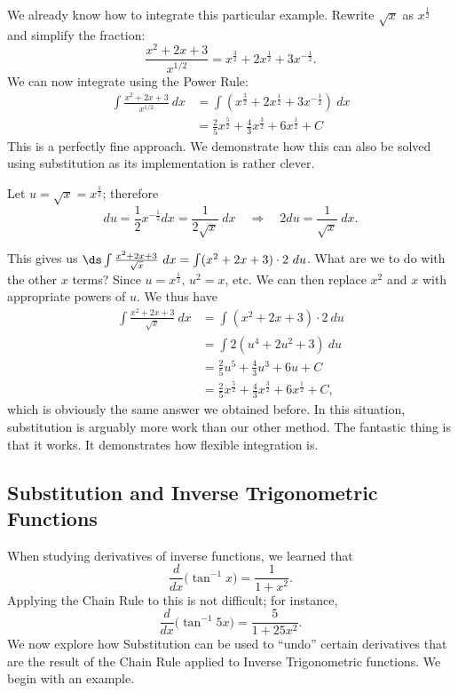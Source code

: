 \begin{solution}
{We already know how to integrate this particular example. Rewrite $\sqrt{x}$ as $x^\frac12$ and simplify the fraction:
	$$ \frac{x^2+2x+3}{x^{1/2}} = x^\frac32 + 2x^\frac12 + 3x^{-\frac12}.$$
We can now integrate using the Power Rule:
\begin{align*}
	\int \frac{x^2+2x+3}{x^{1/2}}\ dx &= \int\left(x^\frac32 + 2x^\frac12 + 3x^{-\frac12}\right)\ dx\\
						&=	\frac25x^\frac52 + \frac43x^\frac32 + 6x^\frac12 + C
\end{align*}
This is a perfectly fine approach. We demonstrate how this can also be solved using substitution as its implementation is rather clever.

Let $u = \sqrt{x} = x^\frac12$; therefore 
		$$du = \frac12x^{-\frac12}dx = \frac{1}{2\sqrt{x}}\ dx \quad \Rightarrow \quad 2du = \frac{1}{\sqrt{x}}\ dx.$$
		
This gives us $\ds \int \frac{x^2+2x+3}{\sqrt{x}}\ dx = \int (x^2+2x+3)\cdot2\ du$. What are we to do with the other $x$ terms? Since $u = x^\frac12$, $u^2 = x$, etc. We can then replace $x^2$ and $x$ with appropriate powers of $u$. We thus have
\begin{align*}
\int \frac{x^2+2x+3}{\sqrt{x}}\ dx &= \int (x^2+2x+3)\cdot2\ du\\
											&= \int 2(u^4 + 2u^2 + 3)\ du \\
											&= \frac25u^5 + \frac43u^3 + 6u + C \\
											&= \frac25x^\frac52 + \frac43x^\frac32 + 6x^\frac12+C,
\end{align*}
which is obviously the same answer we obtained before. In this situation, substitution is arguably more work than our other method. The fantastic thing is that it works. It demonstrates how flexible integration is.
}
\end{solution}




\subsection{Substitution and Inverse Trigonometric Functions}

When studying derivatives of inverse functions, we learned that $$\frac{d}{dx}\big(\tan^{-1}x\big) = \frac{1}{1+x^2}.$$ Applying the Chain Rule to this is not difficult; for instance, $$\frac{d}{dx}\big(\tan^{-1}5x\big) = \frac{5}{1+25x^2}.$$ We now explore how Substitution can be used to ``undo'' certain derivatives that are the result of the Chain Rule applied to Inverse Trigonometric functions. We begin with an example.\\

